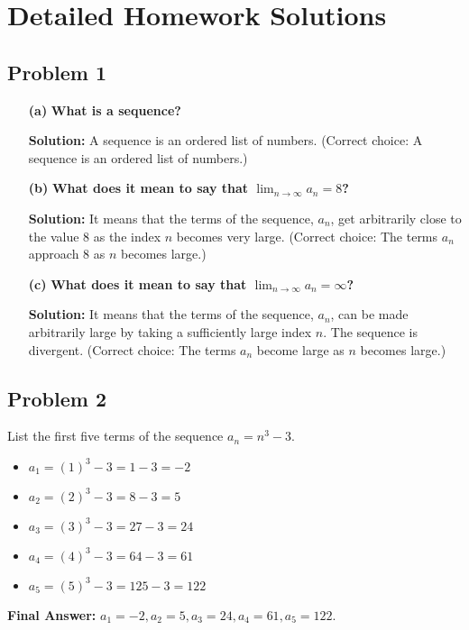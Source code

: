 \documentclass{article}
\begin{document}
\section{Detailed Homework Solutions}

\subsection{Problem 1}
\begin{itemize}
    \item[\textbf{(a)}] \textbf{What is a sequence?}
    
    \textbf{Solution:} A sequence is an ordered list of numbers. (Correct choice: A sequence is an ordered list of numbers.)
    
    \item[\textbf{(b)}] \textbf{What does it mean to say that $\lim_{n \to \infty} a_n = 8$?}
    
    \textbf{Solution:} It means that the terms of the sequence, $a_n$, get arbitrarily close to the value 8 as the index $n$ becomes very large. (Correct choice: The terms $a_n$ approach 8 as $n$ becomes large.)
    
    \item[\textbf{(c)}] \textbf{What does it mean to say that $\lim_{n \to \infty} a_n = \infty$?}
    
    \textbf{Solution:} It means that the terms of the sequence, $a_n$, can be made arbitrarily large by taking a sufficiently large index $n$. The sequence is divergent. (Correct choice: The terms $a_n$ become large as $n$ becomes large.)
\end{itemize}

\subsection{Problem 2}
List the first five terms of the sequence $a_n = n^3 - 3$.
\begin{itemize}
    \item $a_1 = (1)^3 - 3 = 1 - 3 = -2$
    \item $a_2 = (2)^3 - 3 = 8 - 3 = 5$
    \item $a_3 = (3)^3 - 3 = 27 - 3 = 24$
    \item $a_4 = (4)^3 - 3 = 64 - 3 = 61$
    \item $a_5 = (5)^3 - 3 = 125 - 3 = 122$
\end{itemize}
\textbf{Final Answer:} $a_1 = -2, a_2 = 5, a_3 = 24, a_4 = 61, a_5 = 122$.
\end{document}
